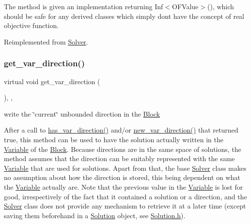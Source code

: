 The method is given an implementation returning Inf$<$\+O\+F\+Value$>$(), which should be safe for any derived classes which simply don\textquotesingle{}t have the concept of real objective function. 

Reimplemented from \mbox{\hyperlink{class_s_m_spp__di__unipi__it_1_1_solver_a7304d819b2eeff3d4ba650055b24e3a5}{Solver}}.

\mbox{\label{class_s_m_spp__di__unipi__it_1_1_m_c_f_solver_af6cbccb8671398cc84c4e0a730a03285}} 
\subsubsection{\texorpdfstring{get\+\_\+var\+\_\+direction()}{get\_var\_direction()}}
{\footnotesize\ttfamily virtual void get\+\_\+var\+\_\+direction (\begin{DoxyParamCaption}\item[{void}]{ }\end{DoxyParamCaption})\hspace{0.3cm}{\ttfamily [inline]}, {\ttfamily [override]}, {\ttfamily [virtual]}}



write the \char`\"{}current\char`\"{} unbounded direction in the \mbox{\hyperlink{class_s_m_spp__di__unipi__it_1_1_block}{Block}} 

After a call to \mbox{\hyperlink{class_s_m_spp__di__unipi__it_1_1_m_c_f_solver_a4f0fecd26f7731710ff6af22fa0cc635}{has\+\_\+var\+\_\+direction()}} and/or \mbox{\hyperlink{class_s_m_spp__di__unipi__it_1_1_solver_a673fc1c81a1fc86e55dfab3a37f303bc}{new\+\_\+var\+\_\+direction()}} that returned true, this method can be used to have the solution actually written in the \mbox{\hyperlink{class_s_m_spp__di__unipi__it_1_1_variable}{Variable}} of the \mbox{\hyperlink{class_s_m_spp__di__unipi__it_1_1_block}{Block}}. Because directions are in the same space of solutions, the method assumes that the direction can be suitably represented with the same \mbox{\hyperlink{class_s_m_spp__di__unipi__it_1_1_variable}{Variable}} that are used for solutions. Apart from that, the base \mbox{\hyperlink{class_s_m_spp__di__unipi__it_1_1_solver}{Solver}} class makes no assumption about how the direction is stored, this being dependent on what the \mbox{\hyperlink{class_s_m_spp__di__unipi__it_1_1_variable}{Variable}} actually are. Note that the previous value in the \mbox{\hyperlink{class_s_m_spp__di__unipi__it_1_1_variable}{Variable}} is lost for good, irrespectively of the fact that it contained a solution or a direction, and the \mbox{\hyperlink{class_s_m_spp__di__unipi__it_1_1_solver}{Solver}} class does not provide any mechanism to retrieve it at a later time (except saving them beforehand in a \mbox{\hyperlink{class_s_m_spp__di__unipi__it_1_1_solution}{Solution}} object, see \mbox{\hyperlink{_solution_8h}{Solution.\+h}}).

